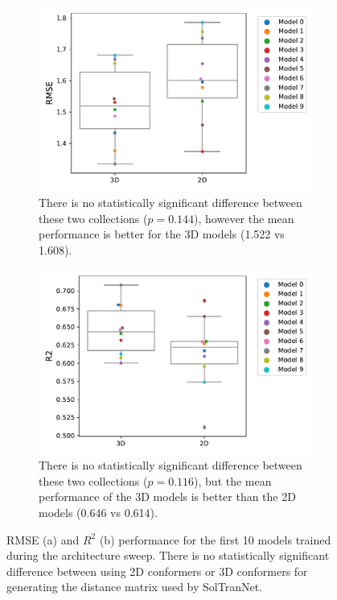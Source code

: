 \documentclass[journal=jcisd8,manuscript=article]{achemso}
\begin{document}
\begin{figure}[tb]
    \begin{subfigure}[t]{0.48\textwidth}
        \centering
        \includegraphics[width=\linewidth]{figures/2dv3d_rmse.pdf}
        \caption{There is no statistically significant difference between these two collections ($p=0.144$), however the mean performance is better for the 3D models (1.522 vs 1.608).}
    \end{subfigure}%
    \hfill
    \begin{subfigure}[t]{0.48\textwidth}
        \centering
        \includegraphics[width=\linewidth]{figures/2dv3d_r2.pdf}
        \caption{There is no statistically significant difference between these two collections ($p=0.116$), but the mean performance of the 3D models is better than the 2D models (0.646 vs 0.614).}
    \end{subfigure}
    \caption{RMSE (a) and $R^2$ (b) performance for the first 10 models trained during the architecture sweep. There is no statistically significant difference between using 2D conformers or 3D conformers for generating the distance matrix used by SolTranNet.}
    \label{fig:2dv3d}
\end{figure}
\end{document}
